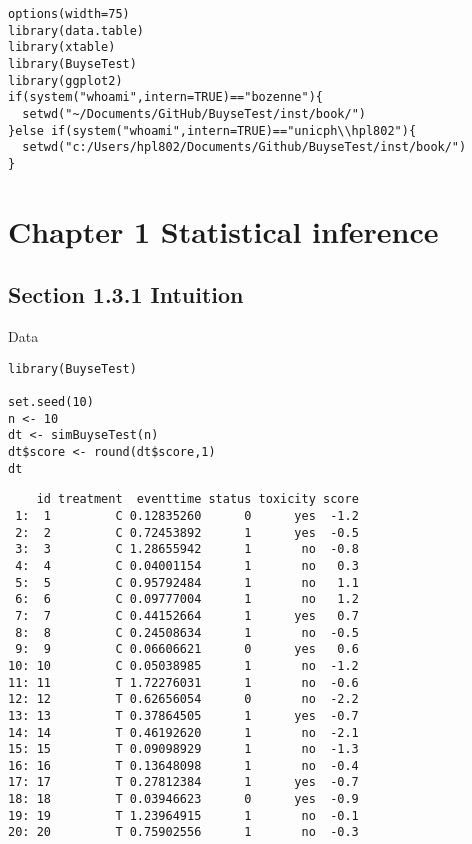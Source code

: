 \documentclass[12pt]{article}
\date{\today}
\title{}
\begin{document}
\lstset{language=r,label= ,caption= ,captionpos=b,numbers=none}
\begin{lstlisting}
options(width=75)
library(data.table)
library(xtable)
library(BuyseTest)
library(ggplot2)
if(system("whoami",intern=TRUE)=="bozenne"){
  setwd("~/Documents/GitHub/BuyseTest/inst/book/")
}else if(system("whoami",intern=TRUE)=="unicph\\hpl802"){
  setwd("c:/Users/hpl802/Documents/Github/BuyseTest/inst/book/")
}
\end{lstlisting}

\section{Chapter 1 Statistical inference}
\label{sec:org5768de1}
\subsection{Section 1.3.1 Intuition}
\label{sec:orge3ec648}

Data
\lstset{language=r,label= ,caption= ,captionpos=b,numbers=none}
\begin{lstlisting}
library(BuyseTest)

set.seed(10)
n <- 10
dt <- simBuyseTest(n)
dt$score <- round(dt$score,1)
dt
\end{lstlisting}

\begin{verbatim}
    id treatment  eventtime status toxicity score
 1:  1         C 0.12835260      0      yes  -1.2
 2:  2         C 0.72453892      1      yes  -0.5
 3:  3         C 1.28655942      1       no  -0.8
 4:  4         C 0.04001154      1       no   0.3
 5:  5         C 0.95792484      1       no   1.1
 6:  6         C 0.09777004      1       no   1.2
 7:  7         C 0.44152664      1      yes   0.7
 8:  8         C 0.24508634      1       no  -0.5
 9:  9         C 0.06606621      0      yes   0.6
10: 10         C 0.05038985      1       no  -1.2
11: 11         T 1.72276031      1       no  -0.6
12: 12         T 0.62656054      0       no  -2.2
13: 13         T 0.37864505      1      yes  -0.7
14: 14         T 0.46192620      1       no  -2.1
15: 15         T 0.09098929      1       no  -1.3
16: 16         T 0.13648098      1       no  -0.4
17: 17         T 0.27812384      1      yes  -0.7
18: 18         T 0.03946623      0      yes  -0.9
19: 19         T 1.23964915      1       no  -0.1
20: 20         T 0.75902556      1       no  -0.3
\end{verbatim}
\end{document}
